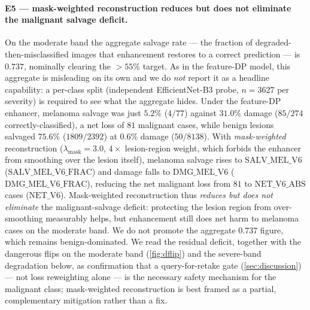 \paragraph{E5 --- mask-weighted reconstruction reduces but does not eliminate the malignant
salvage deficit.}
On the moderate band the aggregate salvage rate --- the fraction of degraded-then-misclassified
images that enhancement restores to a correct prediction --- is $0.737$, nominally clearing the
$>55\%$ target. As in the feature-DP model, this aggregate is misleading on its own and we do
\emph{not} report it as a headline capability: a per-class split (independent EfficientNet-B3
probe, $n=3627$ per severity) is required to see what the aggregate hides. Under the
feature-DP enhancer, melanoma salvage was just $5.2\%$ ($4/77$) against $31.0\%$ damage
($85/274$ correctly-classified), a net loss of $81$ malignant cases, while benign lesions
salvaged $75.6\%$ ($1809/2392$) at $0.6\%$ damage ($50/8138$). With \emph{mask-weighted}
reconstruction ($\lambda_{\text{mask}}=3.0$, $4\times$ lesion-region weight, which forbids the
enhancer from smoothing over the lesion itself), melanoma salvage rises to
$\mathrm{SALV\_MEL\_V6}$ ($\mathrm{SALV\_MEL\_V6\_FRAC}$) and damage falls to
$\mathrm{DMG\_MEL\_V6}$ ($\mathrm{DMG\_MEL\_V6\_FRAC}$), reducing the net malignant loss from
$81$ to $\mathrm{NET\_V6\_ABS}$ cases ($\mathrm{NET\_V6}$). Mask-weighted reconstruction thus
\emph{reduces but does not eliminate} the malignant-salvage deficit: protecting the lesion
region from over-smoothing measurably helps, but enhancement still does net harm to melanoma
cases on the moderate band. We do not promote the aggregate $0.737$ figure, which remains
benign-dominated. We read the residual deficit, together with the dangerous flips on the
moderate band (\cref{fig:dflip}) and the severe-band degradation below, as confirmation that a
query-for-retake gate (\cref{sec:discussion}) --- not loss reweighting alone --- is the
necessary safety mechanism for the malignant class; mask-weighted reconstruction is best framed
as a partial, complementary mitigation rather than a fix.



